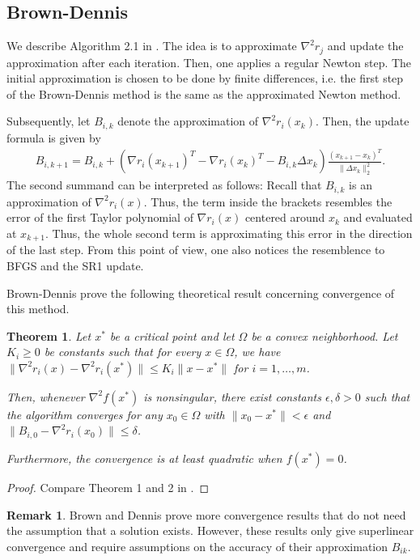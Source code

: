 \documentclass{article}
\theoremstyle{plain}%
\newtheorem{thm}{Theorem}[section]
\theoremstyle{definition}
\newtheorem{rem}{Remark}[section]
\begin{document}
\subsection{Brown-Dennis}
We describe Algorithm 2.1 in \cite{Brown1971}. The idea is to approximate
$\nabla^2 r_j$ and update the approximation after each iteration. Then, one applies a regular
Newton step. The initial
approximation is chosen to be done by finite differences, i.e. the first step of
the Brown-Dennis method is the same as the approximated Newton method. \par
Subsequently, let $B_{i,k}$ denote the approximation of $\nabla^2 r_i(x_k)$.
Then, the update formula is given by 
\begin{align*}
  B_{i,k+1}=B_{i,k}+\left(\nabla r_i(x_{k+1})^T- \nabla r_i (x_k)^T-B_{i,k}\Delta x_k \right)
\frac{(x_{k+1}-x_k)^T}{\|\Delta x_k \|_2^2}.
\end{align*}
The second summand can be interpreted as follows: Recall that $B_{i,k}$ is an approximation of
$\nabla^2 r_i(x)$. Thus, the term inside the brackets resembles the error of the first Taylor
polynomial of $\nabla r_i(x)$ centered around $x_k$ and evaluated at $x_{k+1}$. Thus, the whole
second term is approximating this error in the direction of the last step. From this point of view,
one also notices the resemblence to BFGS and the SR1 update.\par
Brown-Dennis prove the following theoretical result concerning convergence of this method.

\begin{thm}
  Let $x^*$ be a critical point and let $\Omega$ be a convex neighborhood. Let $K_i\geq 0$ be constants such that for every $x \in \Omega$, we have $\| \nabla^2 r_i(x)- \nabla^2 r_i(x^*)\| \leq K_i \| x- x^*\|$ for $i=1,\ldots, m$. \par
 Then, whenever $\nabla^2 f(x^*)$ is nonsingular, there exist constants $\epsilon,\delta>0$ such that  the algorithm converges for any $x_0 \in \Omega$ with $\|x_0-x^*\|< \epsilon$ and $\|B_{i,0}-\nabla^2 r_i (x_0) \|\leq \delta$. \par
Furthermore, the convergence is at least quadratic when $f(x^*)=0$.
\end{thm} 
\begin{proof}
  Compare Theorem 1 and 2 in \cite{Brown1971}.
\end{proof} 
\begin{rem}
  Brown and Dennis prove more convergence results that do not need the assumption that a solution exists.
However, these results only give superlinear convergence and require assumptions on the 
accuracy of their approximation $B_{ik}$.
\end{rem}
\end{document}
